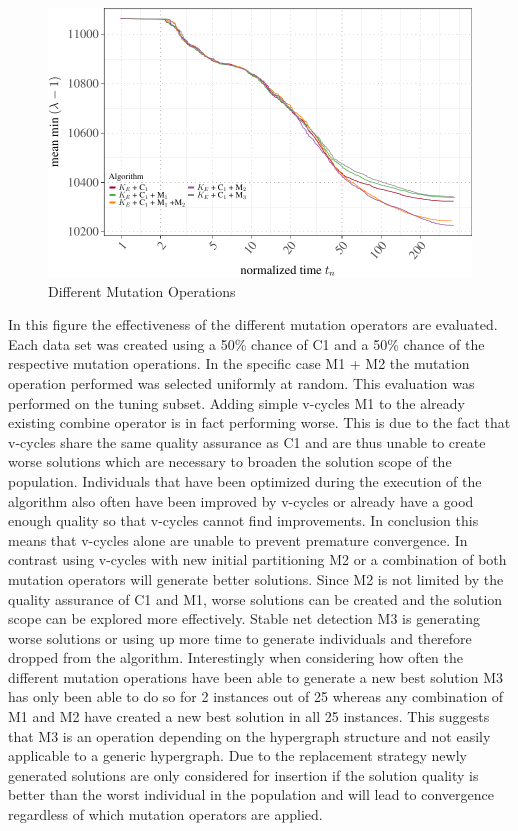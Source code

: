 \documentclass[a4paper,12pt,titlepage, BCOR7mm,headsepline]{scrbook}
\numberwithin{equation}{section}
\begin{document}
\begin{figure}[H]
\caption{Different Mutation Operations}
\begin{center}
\includegraphics{rnw/tuning_subset_plots/mutation_plot-1}
\end{center}

\end{figure}
In this figure the effectiveness of the different mutation operators are evaluated. Each data set was created using a 50\% chance of C1 and a 50\% chance of the respective mutation operations. In the specific case M1 + M2 the mutation operation performed was selected uniformly at random. This evaluation was performed on the tuning subset. Adding simple v-cycles M1 to the already existing combine operator is in fact performing worse. This is due to the fact that v-cycles share the same quality assurance as C1 and are thus unable to create worse solutions which are necessary to broaden the solution scope of the population. Individuals that have been optimized during the execution of the algorithm also often have been improved by v-cycles or already have a good enough quality so that v-cycles cannot find improvements. In conclusion this means that v-cycles alone are unable to prevent premature convergence. In contrast using v-cycles with new initial partitioning M2 or a combination of both mutation operators will generate better solutions. Since M2 is not limited by the quality assurance of C1 and M1, worse solutions can be created and the solution scope can be explored more effectively. Stable net detection M3 is generating worse solutions or using up more time to generate individuals and therefore dropped from the algorithm. Interestingly when considering how often the different mutation operations have been able to generate a new best solution M3 has only been able to do so for 2 instances out of 25 whereas any combination of M1 and M2 have created a new best solution in all 25 instances. This suggests that M3 is an operation depending on the hypergraph structure and not easily applicable to a generic hypergraph. Due to the replacement strategy newly generated solutions are only considered for insertion if the solution quality is better than the worst individual in the population and will lead to convergence regardless of which mutation operators are applied. 
\end{document}
